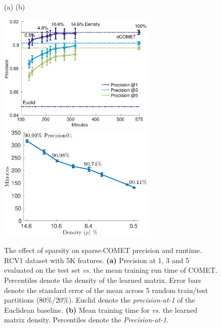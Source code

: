 \documentclass[twoside,11pt]{article}
\begin{document}
\begin{figure}[t]
   \captionsetup{font=small}
\caption{The effect of sparsity on sparse-COMET precision and runtime. RCV1 dataset with 5K features. \textbf{(a)} Precision at 1, 3 and 5 evaluated on the test set {\em vs.} the mean training run time of COMET. Percentiles denote the density of the learned matrix. Error bars denote the standard error of the mean across 5 random train/test partitions (80\%/20\%). Euclid denote the \textit{precision-at-1} of the Euclidean baseline. \textbf{(b)} Mean training time for {\em vs.} the learned matrix density. Percentiles denote the \textit{Precision-at-1}. }\label{spCometPrecTime}
   {
  \centering
    \centerline{
    (a) \hspace{200pt} (b) \hspace{90pt} \newline{}
    }
   \includegraphics[width=7.5cm]{sCOMET_precision_vs_runtime}
   \includegraphics[width=7.5cm]{runtime_vs_density}
   }
   \vskip -4pt
\end{figure}
\end{document}
